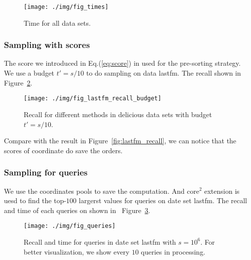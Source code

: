 \documentclass[letterpaper]{article}
\newcommand{\Eqn}[1]   {Eq.(\ref{eq:#1})}
\newcommand{\Fig}[1]   {Figure~\ref{fig:#1}}
\begin{document}
\begin{figure}[]
  \centering
  \texttt{[image: ./img/fig\_times]}\\
  \caption{Time for all data sets.}
  \label{fig:times}
\end{figure}
\subsubsection{Sampling with scores}
The score we introduced in \Eqn{score} in used for the pre-sorting strategy.
We use a budget $t' = s/10$ to do sampling on data lastfm.
The recall shown in \Fig{budget}.
\begin{figure}[ht]
  \centering
  \texttt{[image: ./img/fig\_lastfm\_recall\_budget]}\\
  \caption{Recall for different methods in delicious data sets with budget $t'=s/10$.}
  \label{fig:budget}
\end{figure}
Compare with the result in \Fig{lastfm_recall}, we can notice that the scores of coordinate
do save the orders.
\subsubsection{Sampling for queries}
We use the coordinates pools to save the computation.
And core$^2$ extension is uesd 
to find the top-$100$ largerst values for queries on date set lastfm.
The recall and time of each queries on shown in ~\Fig{Queries}.
\begin{figure}[ht]
  \centering
  \texttt{[image: ./img/fig\_queries]}\\
  \caption{Recall and time for queries in date set lastfm with $s=10^6$.
           For better visualization,
           we show every $10$ queries in processing.}
  \label{fig:Queries}
\end{figure}
\end{document}

